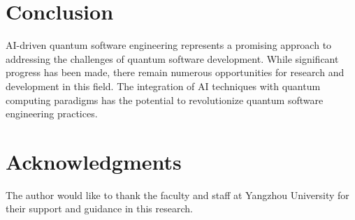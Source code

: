 \documentclass[12pt,a4paper]{article}
\begin{document}
\section{Conclusion}
AI-driven quantum software engineering represents a promising approach to addressing the challenges of quantum software development. While significant progress has been made, there remain numerous opportunities for research and development in this field. The integration of AI techniques with quantum computing paradigms has the potential to revolutionize quantum software engineering practices.

\section*{Acknowledgments}
The author would like to thank the faculty and staff at Yangzhou University for their support and guidance in this research.



\end{document}

